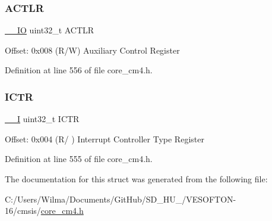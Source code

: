 \subsubsection{\texorpdfstring{A\+C\+T\+LR}{ACTLR}}
{\footnotesize\ttfamily \hyperlink{group___c_m_s_i_s__core__definitions_gaec43007d9998a0a0e01faede4133d6be}{\+\_\+\+\_\+\+IO} uint32\+\_\+t A\+C\+T\+LR}

Offset\+: 0x008 (R/W) Auxiliary Control Register 

Definition at line 556 of file core\+\_\+cm4.\+h.

\mbox{\label{struct_s_cn_s_c_b___type_a5bb2c6795b90f12077534825cc844b56}} 
\subsubsection{\texorpdfstring{I\+C\+TR}{ICTR}}
{\footnotesize\ttfamily \hyperlink{group___c_m_s_i_s__core__definitions_gaf63697ed9952cc71e1225efe205f6cd3}{\+\_\+\+\_\+I} uint32\+\_\+t I\+C\+TR}

Offset\+: 0x004 (R/ ) Interrupt Controller Type Register 

Definition at line 555 of file core\+\_\+cm4.\+h.



The documentation for this struct was generated from the following file\+:\begin{DoxyCompactItemize}
\item 
C\+:/\+Users/\+Wilma/\+Documents/\+Git\+Hub/\+S\+D\+\_\+\+H\+U\+\_/\+V\+E\+S\+O\+F\+T\+O\+N-\/16/cmsis/\hyperlink{core__cm4_8h}{core\+\_\+cm4.\+h}\end{DoxyCompactItemize}
